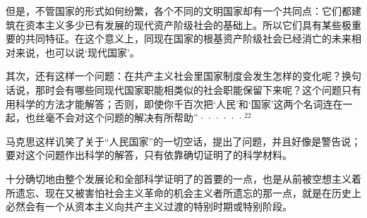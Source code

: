 但是，不管国家的形式如何纷繁，各个不同的文明国家却有一个共同点：它们都建筑在资本主义多少已有发展的现代资产阶级社会的基础上。所以它们具有某些极重要的共同特征。在这个意义上，同现在国家的根基资产阶级社会已经消亡的未来相对来说，也可以说‘现代国家’。

其次，还有这样一个问题：在共产主义社会里国家制度会发生怎样的变化呢？换句话说，那时会有哪些同现代国家职能相类似的社会职能保留下来呢？这个问题只有用科学的方法才能解答；否则，即使你千百次把‘人民’和‘国家’这两个名词连在一起，也丝毫不会对这个问题的解决有所帮助”······$^{22}$

\normalsize
\leftskip=0mm

马克思这样讥笑了关于“人民国家”的一切空话，提出了问题，并且好像是警告说；要对这个问题作出科学的解答，只有依靠确切证明了的科学材料。

十分确切地由整个发展论和全部科学证明了的首要的一点，也是从前被空想主义着所遗忘、现在又被害怕社会主义革命的机会主义者所遗忘的那一点，就是在历史上必然会有一个从资本主义向共产主义{\kaishu 过渡}的特别时期或特别阶段。





